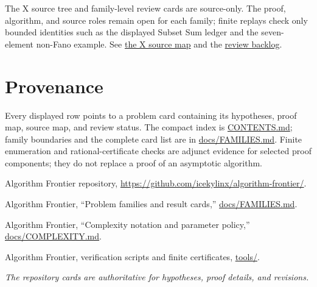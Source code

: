 \documentclass[10pt,a4paper]{article}
\newcommand{\repo}[2]{\href{https://github.com/icekylinx/algorithm-frontier/#1}{#2}}
\theoremstyle{recordstyle}
\begin{document}
The X source tree and family-level review cards are source-only.  The proof,
algorithm, and source roles remain open for each family; finite replays check
only bounded identities such as the displayed Subset Sum ledger and the
seven-element non-Fano example.  See
\repo{sources/checkpoint-x/}{the X source map} and the
\repo{reviews/backlog/checkpoint-x-drafts.md}{review backlog}.

\section{Provenance}
Every displayed row points to a problem card containing its hypotheses, proof
map, source map, and review status.  The compact index is
\repo{CONTENTS.md}{CONTENTS.md}; family boundaries and the complete card list
are in \repo{docs/FAMILIES.md}{docs/FAMILIES.md}.  Finite enumeration and
rational-certificate checks are adjunct evidence for selected proof components;
they do not replace a proof of an asymptotic algorithm.

\begin{thebibliography}{9}
Algorithm Frontier repository, \url{https://github.com/icekylinx/algorithm-frontier/}.

Algorithm Frontier, ``Problem families and result cards,''
\repo{docs/FAMILIES.md}{docs/FAMILIES.md}.

Algorithm Frontier, ``Complexity notation and parameter policy,''
\repo{docs/COMPLEXITY.md}{docs/COMPLEXITY.md}.

Algorithm Frontier, verification scripts and finite certificates,
\repo{tools/}{tools/}.
\end{thebibliography}

\vfill
\begin{center}
\footnotesize\textit{The repository cards are authoritative for hypotheses,
proof details, and revisions.}
\end{center}
\end{document}

